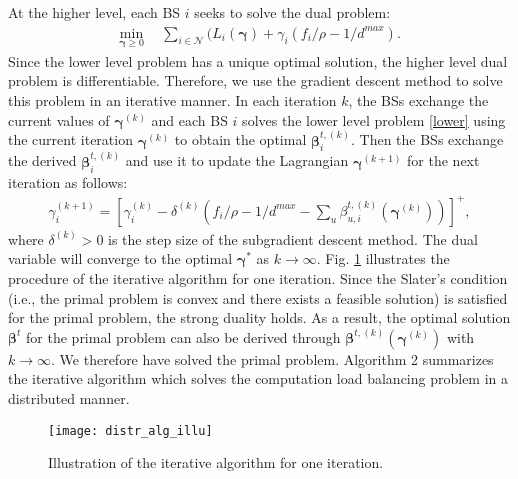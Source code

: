 \documentclass[12pt, draftclsnofoot, letterpaper, onecolumn]{IEEEtran}
\begin{document}
{At the higher level, each BS $i$ seeks to solve the dual problem:
\begin{align}
\min_{\bm\gamma \geq 0}&~~\sum_{i\in\mathcal{N}}(L_i(\bm\gamma) + \gamma_i(f_i/\rho - 1/d^{max}). \label{higher}
\end{align}
Since the lower level problem has a unique optimal solution, the higher level dual problem is differentiable. Therefore, we use the gradient descent method to solve this problem in an iterative manner. In each iteration $k$, the BSs exchange the current values of $\bm\gamma^{(k)}$ and each BS $i$ solves the lower level problem \eqref{lower} using the current iteration $\bm\gamma^{(k)}$ to obtain the optimal $\bm\beta^{t, (k)}_i$. Then the BSs exchange the derived $\bm\beta^{t, (k)}_i$ and use it to update the Lagrangian $\bm\gamma^{(k+1)}$ for the next iteration as follows:
\begin{align}
\gamma_i^{(k+1)} = [\gamma_i^{(k)} - \delta^{(k)}(f_i/\rho - 1/d^{max} - \sum_{u}\beta^{t,(k)}_{u,i}(\bm\gamma^{(k)}))]^+, \label{update}
\end{align}
where $\delta^{(k)} > 0$ is the step size of the subgradient descent method. The dual variable will converge to the optimal $\bm\gamma^*$ as $k \to \infty$. Fig. \ref{fig:distralgillu} illustrates the procedure of the iterative algorithm for one iteration. Since the Slater's condition (i.e., the primal problem is convex and there exists a feasible solution) is satisfied for the primal problem, the strong duality holds. As a result, the optimal solution $\bm\beta^t$ for the primal problem can also be derived through $\bm\beta^{t, (k)}(\bm\gamma^{(k)})$ with $k \to \infty$. We therefore have solved the primal problem. Algorithm 2 summarizes the iterative algorithm which solves the computation load balancing problem in a distributed manner.

\begin{figure}[t]
	\centering
	\texttt{[image: distr\_alg\_illu]}
	\caption{Illustration of the iterative algorithm for one iteration.}
	\label{fig:distralgillu}
\vspace{-20pt}
\end{figure}

}
\end{document}
